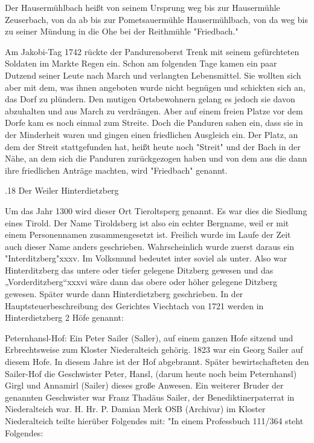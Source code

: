 Der Hausermühlbach heißt von seinem Ursprung weg bis zur Hausermühle Zeuserbach,
von da ab bis zur Pometsauermühle Hausermühlbach, von da weg bis zu seiner
Mündung in die Ohe bei der Reithmühle "Friedbach."

Am Jakobi-Tag 1742 rückte der Pandurenoberst Trenk mit seinem gefürchteten
Soldaten im Markte Regen ein. Schon am folgenden Tage kamen ein paar Dutzend
seiner Leute nach March und verlangten Lebensmittel. Sie wollten sich aber mit
dem, was ihnen angeboten wurde nicht begnügen und schickten sich an, das Dorf zu
plündern. Den mutigen Ortsbewohnern gelang es jedoch sie davon abzuhalten und
aus March zu verdrängen. Aber auf einem freien Platze vor dem Dorfe kam es noch
einmal zum Streite. Doch die Panduren sahen ein, dass sie in der Minderheit
waren und gingen einen friedlichen Ausgleich ein. Der Platz, an dem der Streit
stattgefunden hat, heißt heute noch "Streit" und der Bach in der Nähe, an dem
sich die Panduren zurückgezogen haben und von dem aus die dann ihre friedlichen
Anträge machten, wird "Friedbach" genannt.

.18 Der Weiler Hinterdietzberg

Um das Jahr 1300 wird dieser Ort Tieroltsperg genannt. Es war dies die Siedlung
eines Tirold. Der Name Tiroldsberg ist also ein echter Bergname, weil er mit
einem Personennamen zusammengesetzt ist. Freilich wurde im Laufe der Zeit auch
dieser Name anders geschrieben. Wahrscheinlich wurde zuerst daraus ein
"Interditzberg"xxxv. Im Volksmund bedeutet inter soviel als unter. Also war
Hinterditzberg das untere oder tiefer gelegene Ditzberg gewesen und das
„Vorderditzberg“xxxvi wäre dann das obere oder höher gelegene Ditzberg gewesen.
Später wurde dann Hinterdietzberg geschrieben. In der Hauptsteuerbeschreibung
des Gerichtes Viechtach von 1721 werden in Hinterdietzberg 2 Höfe genannt:

Peternhansl-Hof: Ein Peter Sailer (Saller), auf einem ganzen Hofe sitzend und
Erbrechtsweise zum Kloster Niederalteich gehörig. 1823 war ein Georg Sailer auf
diesem Hofe. In diesem Jahre ist der Hof abgebrannt. Später bewirtschafteten den
Sailer-Hof die Geschwister Peter, Hansl, (darum heute noch beim Peternhansl)
Girgl und Annamirl (Sailer) dieses große Anwesen. Ein weiterer Bruder der
genannten Geschwister war Franz Thadäus Sailer, der Benediktinerpaterrat in
Niederalteich war. H. Hr. P. Damian Merk OSB (Archivar) im Kloster Niederalteich
teilte hierüber Folgendes mit: "In einem Professbuch 111/364 steht Folgendes:

 

